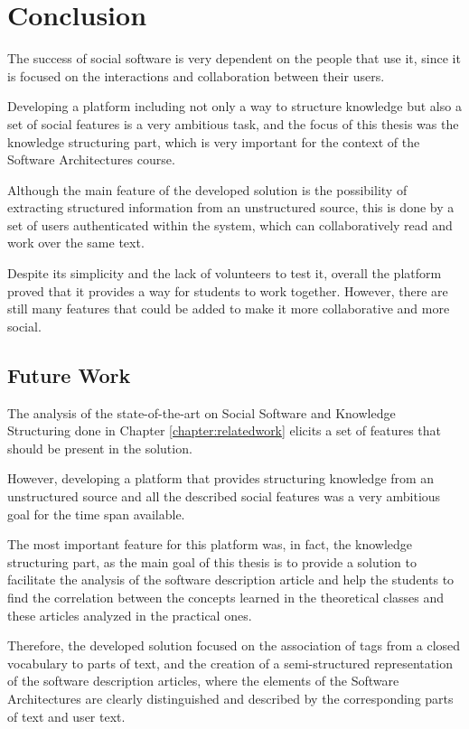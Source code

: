 
\chapter{Conclusion}
\label{chapter:conclusion}

The success of social software is very dependent on the people that use it, since it is focused on the interactions and collaboration between their users.

Developing a platform including not only a way to structure knowledge but also a set of social features is a very ambitious task, and the focus of this thesis was the knowledge structuring part, which is very important for the context of the Software Architectures course.

Although the main feature of the developed solution is the possibility of extracting structured information from an unstructured source, this is done by a set of users authenticated within the system, which can collaboratively read and work over the same text.

Despite its simplicity and the lack of volunteers to test it, overall the platform proved that it provides a way for students to work together. However, there are still many features that could be added to make it more collaborative and more social.

\section{Future Work}
\label{chapter:futureWork}

The analysis of the state-of-the-art on Social Software and Knowledge Structuring done in Chapter \ref{chapter:relatedwork} elicits a set of features that should be present in the solution.

However, developing a platform that provides structuring knowledge from an unstructured source and all the described social features was a very ambitious goal for the time span available. 

The most important feature for this platform was, in fact, the knowledge structuring part, as the main goal of this thesis is to provide a solution to facilitate the analysis of the software description article and help the students to find the correlation between the concepts learned in the theoretical classes and these articles analyzed in the practical ones.

Therefore, the developed solution focused on the association of tags from a closed vocabulary to parts of text, and the creation of a semi-structured representation of the software description articles, where the elements of the Software Architectures are clearly distinguished and described by the corresponding parts of text and user text.

